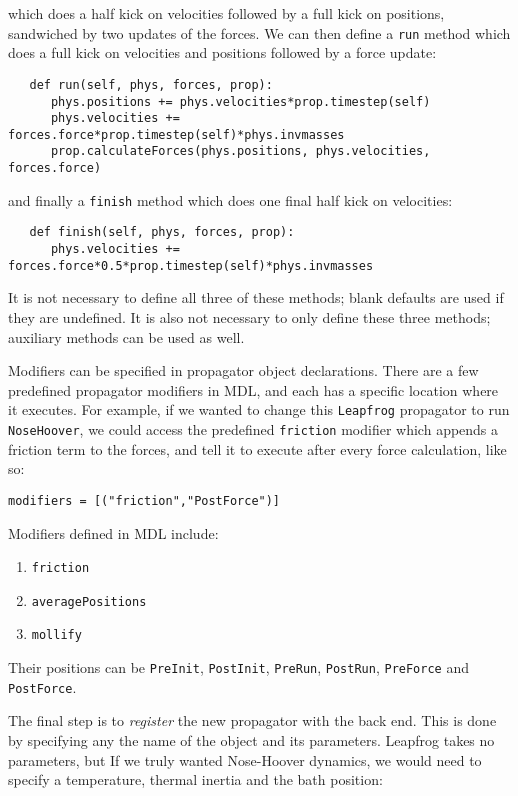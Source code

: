 \documentclass[11pt]{report}
\begin{document}
which does a half kick on velocities followed by a full kick on positions,
sandwiched by two updates of the forces.  We can then define a \texttt{run}
method which does a full kick on velocities and positions followed
by a force update:

\begin{verbatim}
   def run(self, phys, forces, prop):
      phys.positions += phys.velocities*prop.timestep(self)
      phys.velocities += forces.force*prop.timestep(self)*phys.invmasses
      prop.calculateForces(phys.positions, phys.velocities, forces.force)
\end{verbatim}

and finally a \texttt{finish} method which does one final half
kick on velocities:

\begin{verbatim}
   def finish(self, phys, forces, prop):
      phys.velocities += forces.force*0.5*prop.timestep(self)*phys.invmasses
\end{verbatim}

It is not necessary to define all three of these methods; blank defaults
are used if they are undefined.  It is also not necessary to only define
these three methods; auxiliary methods can be used as well.

Modifiers can be specified in propagator object declarations.
There are a few predefined propagator modifiers in MDL, and each 
has a specific location where it executes.  For example, if we wanted
to change this \texttt{Leapfrog} propagator to run \texttt{NoseHoover},
we could access the predefined \texttt{friction} modifier which appends
a friction term to the forces, and tell it to execute after
every force calculation, like so:

\texttt{modifiers = [("friction","PostForce")]}

Modifiers defined in MDL include:
\begin{enumerate}
\item \texttt{friction}
\item \texttt{averagePositions}
\item \texttt{mollify}
\end{enumerate}

Their positions can be \texttt{PreInit}, \texttt{PostInit},
\texttt{PreRun}, \texttt{PostRun}, \texttt{PreForce} and 
\texttt{PostForce}.

The final step is to {\it register} the new propagator
with the back end.  This is done by specifying any 
the name of the object and its parameters.  Leapfrog takes
no parameters, but If we truly wanted
Nose-Hoover dynamics, we would need to specify a temperature,
thermal inertia and the bath position:
\end{document}
